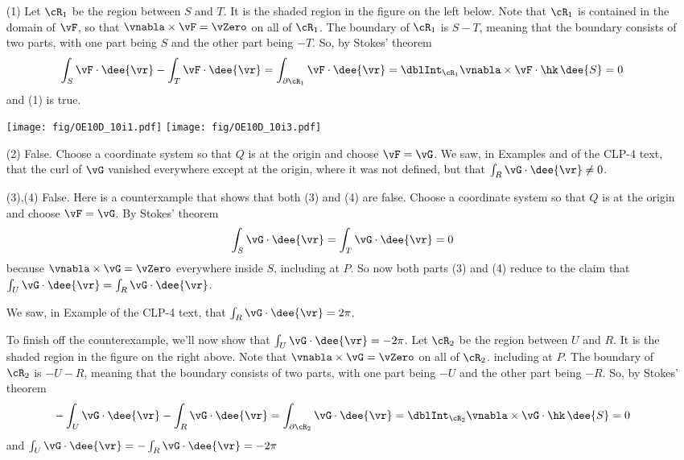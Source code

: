 \begin{solution}
\begin{itemize}\itemsep1pt \parskip0pt  %
\item[(1)] 
Let $\cR_1$ be the region between $S$ and $T$. It is the shaded region 
in the figure on the left below. Note that $\cR_1$ is contained in the 
domain of $\vF$, so that $\vnabla\times\vF=\vZero$ on all of $\cR_1$.
The boundary of $\cR_1$ is $S-T$, meaning that the boundary consists 
of two parts, with one part being $S$ and the other part being $-T$. 
So, by Stokes' theorem
\begin{equation*}
\int_S \vF\cdot\dee{\vr} - \int_T \vF\cdot\dee{\vr}
=\int_{\partial \cR_1} \vF\cdot\dee{\vr}
=\dblInt_{\cR_1} \vnabla\times\vF\cdot\hk\, \dee{S}
=0
\end{equation*}
and (1) is true.
 
  \begin{center}
       \texttt{[image: fig/OE10D\_10i1.pdf]}\qquad\qquad
       \texttt{[image: fig/OE10D\_10i3.pdf]}
  \end{center}

\item[(2)] False. Choose a coordinate system so that $Q$ is at the origin
and choose $\vF=\vG$.
We saw, in Examples  and
 of the CLP-4 text, that the curl of  
$\vG$ vanished everywhere except at the origin, where it was not defined,
but that $\int_R \vG\cdot\dee{\vr} \ne 0$.

\item[(3),(4)] False. Here is a counterxample that shows that both
(3) and (4) are false. Choose a coordinate system so that $Q$ is 
at the origin and choose $\vF=\vG$. By Stokes' theorem 
\begin{equation*}
\int_S \vG\cdot\dee{\vr} 
= \int_T \vG\cdot\dee{\vr} = 0
\end{equation*} 
because $\vnabla\times\vG=\vZero$ everywhere inside $S$, including at $P$.
So now both parts (3) and (4) reduce to the claim that 
$\int_U \vG\cdot\dee{\vr} 
= \int_R \vG\cdot\dee{\vr}$.

We saw, in Example  of the CLP-4 text, that  $\int_R \vG\cdot\dee{\vr} = 2\pi$. 

To finish off the counterexample,
we'll now show that $\int_U \vG\cdot\dee{\vr} = -2\pi$.
Let $\cR_2$ be the region between $U$ and $R$. It is the shaded region 
in the figure on the right above. Note that $\vnabla\times\vG=\vZero$ 
on all of $\cR_2$. including at $P$.
The boundary of $\cR_2$ is $-U-R$, meaning that the boundary consists 
of two parts, with one part being $-U$ and the other part being $-R$. 
So, by Stokes' theorem
\begin{equation*}
-\int_U \vG\cdot\dee{\vr} - \int_R \vG\cdot\dee{\vr}
=\int_{\partial \cR_2} \vG\cdot\dee{\vr}
=\dblInt_{\cR_2} \vnabla\times\vG\cdot\hk\, \dee{S}
=0
\end{equation*}
and 
$\int_U \vG\cdot\dee{\vr} =-\int_R \vG\cdot\dee{\vr} = -2\pi$



\end{itemize}
\end{solution}
